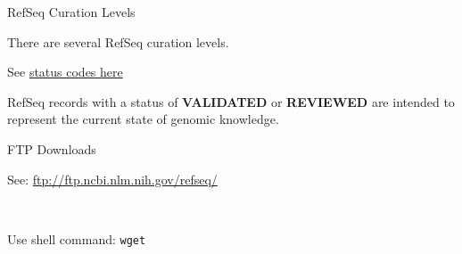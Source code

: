 \begin{frame}{RefSeq Curation Levels}

There are several RefSeq curation levels.

See
\href{http://www.ncbi.nlm.nih.gov/books/NBK21091/table/ch18.T.refseq_status_codes/?report=objectonly}{status
codes here}

RefSeq records with a status of \textbf{VALIDATED} or \textbf{REVIEWED}
are intended to represent the current state of genomic knowledge.

\end{frame}

\begin{frame}{FTP Downloads}

See: \url{ftp://ftp.ncbi.nlm.nih.gov/refseq/}

~

Use shell command: \texttt{wget}

\end{frame}
